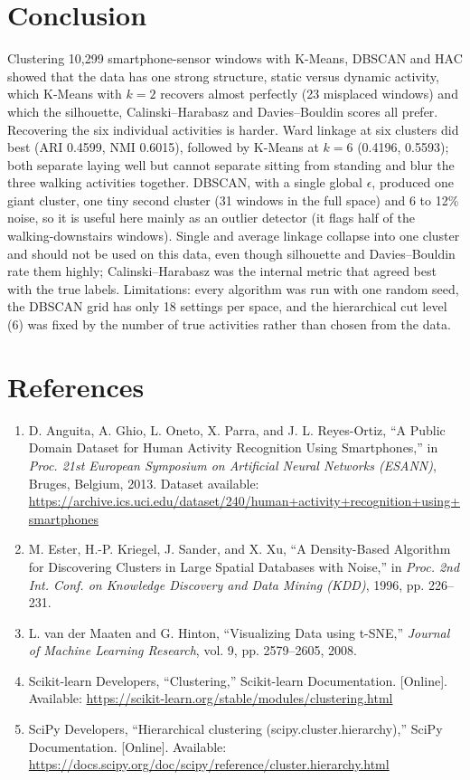 \documentclass[12pt,a4paper]{article}
\begin{document}
\section{Conclusion}
Clustering 10,299 smartphone-sensor windows with K-Means, DBSCAN and HAC showed that the data
has one strong structure, static versus dynamic activity, which K-Means with $k=2$ recovers almost
perfectly (23 misplaced windows) and which the silhouette, Calinski--Harabasz and
Davies--Bouldin scores all prefer. Recovering the six individual activities is harder. Ward
linkage at six clusters did best (ARI 0.4599, NMI 0.6015), followed by K-Means at $k=6$ (0.4196,
0.5593); both separate laying well but cannot separate sitting from standing and blur the three
walking activities together. DBSCAN, with a single global $\epsilon$, produced one giant cluster,
one tiny second cluster (31 windows in the full space) and 6 to 12\% noise, so it is useful here
mainly as an outlier detector
(it flags half of the walking-downstairs windows). Single and average linkage collapse into one
cluster and should not be used on this data, even though silhouette and Davies--Bouldin rate them
highly; Calinski--Harabasz was the internal metric that agreed best with the true labels.
Limitations: every algorithm was run with one random seed, the DBSCAN grid has only 18 settings per
space, and the hierarchical cut level (6) was fixed by the number of true activities rather than
chosen from the data.

\section{References}
\begin{enumerate}
\item D. Anguita, A. Ghio, L. Oneto, X. Parra, and J. L. Reyes-Ortiz, ``A Public Domain Dataset
for Human Activity Recognition Using Smartphones,'' in \emph{Proc. 21st European Symposium on
Artificial Neural Networks (ESANN)}, Bruges, Belgium, 2013. Dataset available:
\url{https://archive.ics.uci.edu/dataset/240/human+activity+recognition+using+smartphones}
\item M. Ester, H.-P. Kriegel, J. Sander, and X. Xu, ``A Density-Based Algorithm for Discovering
Clusters in Large Spatial Databases with Noise,'' in \emph{Proc. 2nd Int. Conf. on Knowledge
Discovery and Data Mining (KDD)}, 1996, pp. 226--231.
\item L. van der Maaten and G. Hinton, ``Visualizing Data using t-SNE,'' \emph{Journal of Machine
Learning Research}, vol. 9, pp. 2579--2605, 2008.
\item Scikit-learn Developers, ``Clustering,'' Scikit-learn Documentation. [Online]. Available:
\url{https://scikit-learn.org/stable/modules/clustering.html}
\item SciPy Developers, ``Hierarchical clustering (scipy.cluster.hierarchy),'' SciPy
Documentation. [Online]. Available:
\url{https://docs.scipy.org/doc/scipy/reference/cluster.hierarchy.html}
\end{enumerate}
\end{document}
